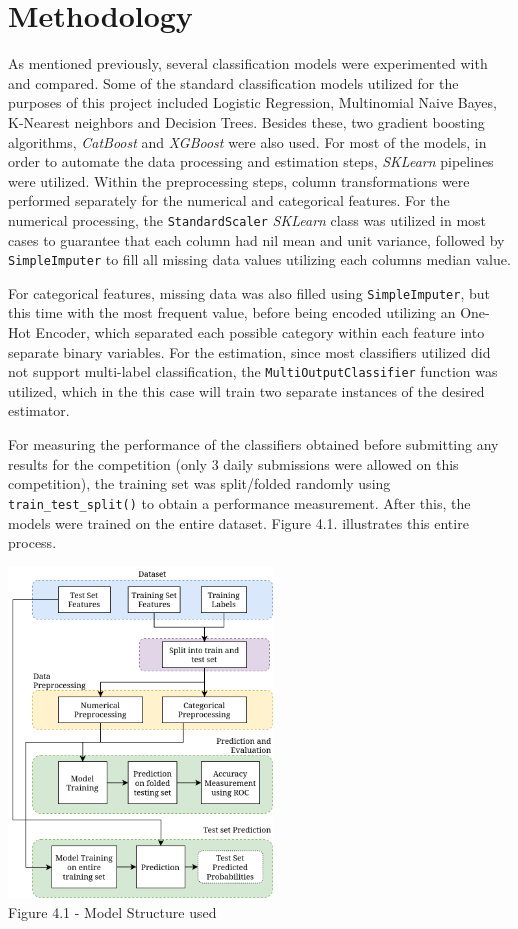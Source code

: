 \documentclass{IEEEtran}
\begin{document}
\section{Methodology}
As mentioned previously, several classification models were experimented with and compared. Some of the standard classification models utilized for the purposes of this project included Logistic Regression, Multinomial Naive Bayes, K-Nearest neighbors and Decision Trees. Besides these, two gradient boosting algorithms, \textit{CatBoost} and \textit{XGBoost} were also used.
For most of the models, in order to automate the data processing and estimation steps, \textit{SKLearn} pipelines were utilized. Within the preprocessing steps, column transformations were performed separately for the numerical and categorical features. For the numerical processing, the \texttt{StandardScaler} \textit{SKLearn} class was utilized in most cases to guarantee that each column had nil mean and unit variance, followed by \texttt{SimpleImputer} to fill all missing data values utilizing each columns median value.

For categorical features, missing data was also filled using \texttt{SimpleImputer}, but this time with the most frequent value, before being encoded utilizing an One-Hot Encoder, which separated each possible category within each feature into separate binary variables.
For the estimation, since most classifiers utilized did not support multi-label classification, the \texttt{MultiOutputClassifier} function was utilized, which in the this case will train two separate instances of the desired estimator.

For measuring the performance of the classifiers obtained before submitting any results for the competition (only 3 daily submissions were allowed on this competition), the training set was split/folded randomly using \texttt{train\_test\_split()} to obtain a performance measurement. After this, the models were trained on the entire dataset. Figure 4.1. illustrates this entire process.

\begin{center}
    \includegraphics[width=7cm]{figures/MethodologyStructure.png}\\
    Figure 4.1 - Model Structure used
\end{center}
\end{document}

